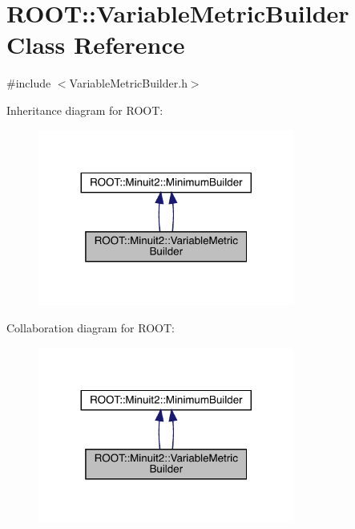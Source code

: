 \hypertarget{classROOT_1_1Minuit2_1_1VariableMetricBuilder}{}\section{R\+O\+OT\+:\+:Variable\+Metric\+Builder Class Reference}
\label{classROOT_1_1Minuit2_1_1VariableMetricBuilder}


{\ttfamily \#include $<$Variable\+Metric\+Builder.\+h$>$}



Inheritance diagram for R\+O\+OT\+:\nopagebreak
\begin{figure}[H]
\begin{center}
\leavevmode
\includegraphics[width=239pt]{dc/dfd/classROOT_1_1Minuit2_1_1VariableMetricBuilder__inherit__graph}
\end{center}
\end{figure}


Collaboration diagram for R\+O\+OT\+:\nopagebreak
\begin{figure}[H]
\begin{center}
\leavevmode
\includegraphics[width=239pt]{dd/de2/classROOT_1_1Minuit2_1_1VariableMetricBuilder__coll__graph}
\end{center}
\end{figure}
